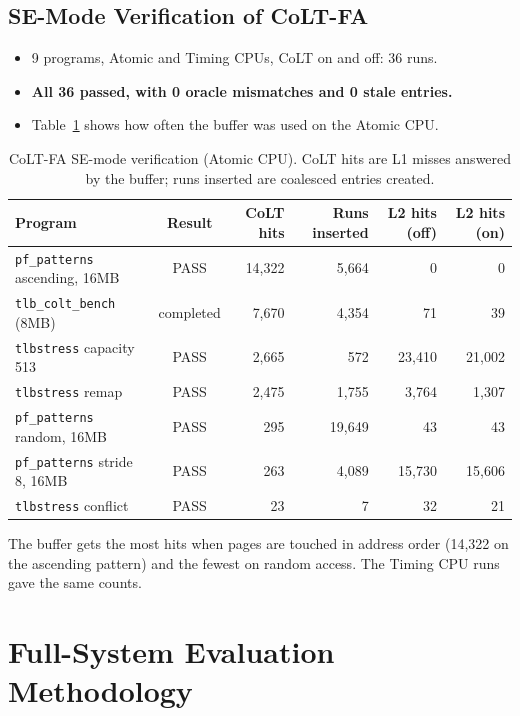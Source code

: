 \subsection{SE-Mode Verification of CoLT-FA}
\label{sec:colt_se}
\begin{itemize}
    \item 9 programs, Atomic and Timing CPUs, CoLT on and off: 36 runs.
    \item \textbf{All 36 passed, with 0 oracle mismatches and 0 stale entries.}
    \item Table~\ref{tab:colt_se} shows how often the buffer was used on the Atomic CPU.
\end{itemize}

\begin{table}[htbp]
\centering
\small
\caption{CoLT-FA SE-mode verification (Atomic CPU). CoLT hits are L1 misses answered by the buffer; runs inserted are coalesced entries created.}
\label{tab:colt_se}
\begin{tabular}{l c r r r r}
\toprule
\textbf{Program} & \textbf{Result} & \textbf{CoLT hits} & \textbf{Runs inserted} & \textbf{L2 hits (off)} & \textbf{L2 hits (on)} \\
\midrule
\texttt{pf\_patterns} ascending, 16MB & PASS & 14,322 & 5,664 & 0 & 0 \\
\texttt{tlb\_colt\_bench} (8MB) & completed & 7,670 & 4,354 & 71 & 39 \\
\texttt{tlbstress} capacity 513 & PASS & 2,665 & 572 & 23,410 & 21,002 \\
\texttt{tlbstress} remap & PASS & 2,475 & 1,755 & 3,764 & 1,307 \\
\texttt{pf\_patterns} random, 16MB & PASS & 295 & 19,649 & 43 & 43 \\
\texttt{pf\_patterns} stride 8, 16MB & PASS & 263 & 4,089 & 15,730 & 15,606 \\
\texttt{tlbstress} conflict & PASS & 23 & 7 & 32 & 21 \\
\bottomrule
\end{tabular}
\end{table}

\noindent The buffer gets the most hits when pages are touched in address order (14,322 on the ascending pattern) and the fewest on random access. The Timing CPU runs gave the same counts.

\section{Full-System Evaluation Methodology}
\label{sec:fs_method}

